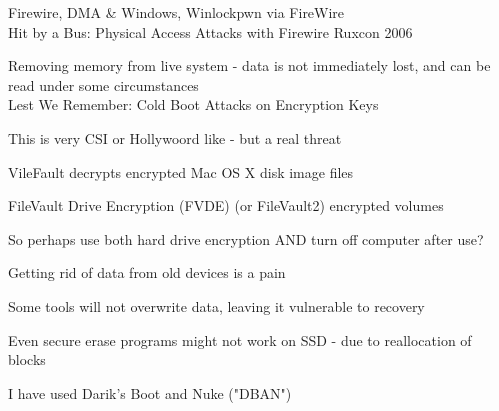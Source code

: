 \documentclass[Screen16to9,17pt]{foils}
\begin{document}

\begin{list1}
\item Firewire, DMA \& Windows, Winlockpwn via FireWire\\
Hit by a Bus: Physical Access Attacks with Firewire Ruxcon 2006
\vskip 5mm
\item Removing memory from live system - data is not immediately lost, and can be read under some circumstances\\
Lest We Remember: Cold Boot Attacks on Encryption Keys\\
\item This is very CSI or Hollywoord like - but a real threat
\item VileFault decrypts encrypted Mac OS X disk image files\\ 

\item  FileVault Drive Encryption (FVDE) (or FileVault2) encrypted volumes\\
\end{list1}

\centerline{So perhaps use both hard drive encryption AND turn off computer after use?}



\begin{list1}
\item Getting rid of data from old devices is a pain
\item Some tools will not overwrite data, leaving it vulnerable to recovery
\item Even secure erase programs might not work on SSD - due to reallocation of blocks
\item I have used Darik's Boot and Nuke ("DBAN") 
\end{list1}



\slidenext{}
\end{document}
